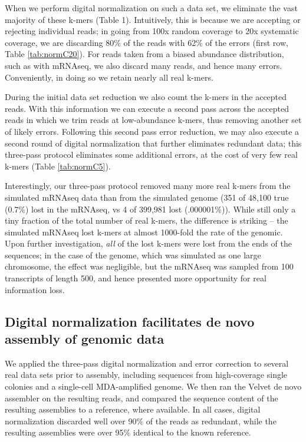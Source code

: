 \documentclass[10pt,draft]{article}
\begin{document}
When we perform digital normalization on such a data set, we eliminate
the vast majority of these k-mers (Table 1).  Intuitively, this is
because we are accepting or rejecting individual reads; in going from
100x random coverage to 20x systematic coverage, we are discarding
80\% of the reads with 62\% of the errors (first row, Table \ref{tab:normC20}).
For reads taken from a biased abundance distribution, such as with
mRNAseq, we also discard many reads, and hence many errors.
Conveniently, in doing so we retain nearly all real k-mers.

During the initial data set reduction we also count the k-mers in the
accepted reads.  With this information we can execute a second pass
across the accepted reads in which we trim reads at low-abundance
k-mers, thus removing another set of likely errors.  Following this
second pass error reduction, we may also execute a second round of
digital normalization that further eliminates redundant data; this
three-pass protocol eliminates some additional errors, at the cost
of very few real k-mers (Table \ref{tab:normC5}).

Interestingly, our three-pass protocol removed many more real k-mers
from the simulated mRNAseq data than from the simulated genome (351 of
48,100 true (0.7\%) lost in the mRNAseq, vs 4 of 399,981 lost
(.000001\%)).  While still only a tiny fraction of the total number of
real k-mers, the difference is striking -- the simulated mRNAseq lost
k-mers at almost 1000-fold the rate of the genomic.  Upon further
investigation, {\em all} of the lost k-mers were lost from the ends
of the sequences; in the case of the genome, which was simulated as
one large chromosome, the effect was negligible, but the mRNAseq
was sampled from 100 transcripts of length 500, and hence presented
more opportunity for real information loss.

\subsection*{Digital normalization facilitates de novo assembly of genomic data}

We applied the three-pass digital normalization and error correction
to several real data sets prior to assembly, including sequences from
high-coverage single colonies and a single-cell MDA-amplified genome.
We then ran the Velvet de novo assembler on the resulting reads, and
compared the sequence content of the resulting assemblies to a
reference, where available.  In all cases, digital normalization
discarded well over 90\% of the reads as redundant, while the
resulting assemblies were over 95\% identical to the known reference.
\end{document}
